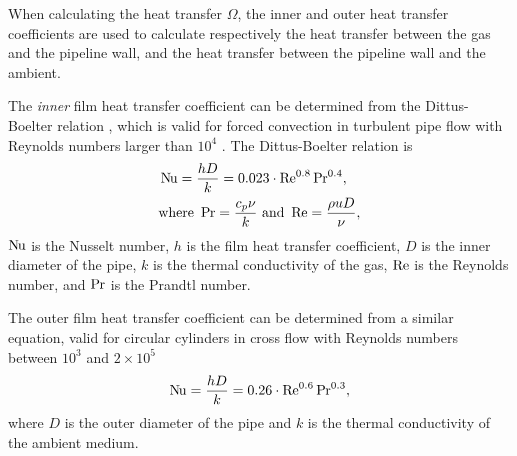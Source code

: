 When calculating the heat transfer $\Omega$, the inner and outer heat transfer coefficients are used to calculate respectively the heat transfer between the gas and the pipeline wall, and the heat transfer between the pipeline wall and the ambient. 

The \emph{inner} film heat transfer coefficient can be determined from the Dittus-Boelter relation \cite{Winterton1998Where,Dittus1985Heat}, which is valid for forced convection in turbulent pipe flow with Reynolds numbers larger than $10^4$ \cite{Bergman2011Fundamentals}. The Dittus-Boelter relation is
\begin{align}
    &\operatorname{N\kern-.09em u} = \frac{hD}{k} = 0.023\cdot\operatorname{R\kern-.04em e}^{0.8}\operatorname{P\kern-.03em r}^{0.4},
    \\
    &\mathrm{where~} \operatorname{P\kern-.03em r} = \frac{c_p\nu}{k} \mathrm{~and~} \operatorname{R\kern-.04em e} = \frac{\rho u D}{\nu},
\end{align}
$\operatorname{N\kern-.09em u}$ is the Nusselt number, $h$ is the film heat transfer coefficient, $D$ is the inner diameter of the pipe, $k$ is the thermal conductivity of the gas, $\operatorname{R\kern-.04em e}$ is the Reynolds number, and $\operatorname{P\kern-.03em r}$ is the Prandtl number. 

The outer film heat transfer coefficient can be determined from a similar equation, valid for circular cylinders in cross flow with Reynolds numbers between $10^3$ and $2\times 10^5$ %
\begin{align}
    \operatorname{N\kern-.09em u} = \frac{hD}{k} = 0.26\cdot\operatorname{R\kern-.04em e}^{0.6}\operatorname{P\kern-.03em r}^{0.3}
,
\end{align}
where $D$ is the outer diameter of the pipe and $k$ is the thermal conductivity of the ambient medium.

